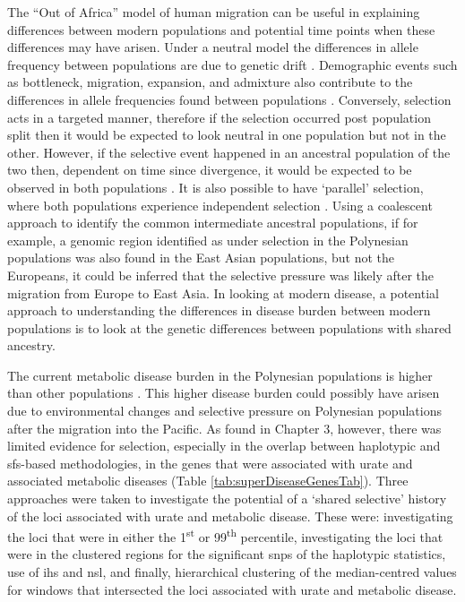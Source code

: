 \documentclass[]{report}
\begin{document}
The ``Out of Africa'' model of human migration can be useful in
explaining differences between modern populations and potential time
points when these differences may have arisen. Under a neutral model the
differences in allele frequency between populations are due to genetic
drift \citep{kimura1979neutral}. Demographic events such as bottleneck,
migration, expansion, and admixture also contribute to the differences
in allele frequencies found between populations \citep{Wright1951}.
Conversely, selection acts in a targeted manner, therefore if the
selection occurred post population split then it would be expected to
look neutral in one population but not in the other. However, if the
selective event happened in an ancestral population of the two then,
dependent on time since divergence, it would be expected to be observed
in both populations \citep{Hermisson2017}. It is also possible to have
`parallel' selection, where both populations experience independent
selection \citep{Tennessen2011}. Using a coalescent approach to identify
the common intermediate ancestral populations, if for example, a genomic
region identified as under selection in the Polynesian populations was
also found in the East Asian populations, but not the Europeans, it
could be inferred that the selective pressure was likely after the
migration from Europe to East Asia. In looking at modern disease, a
potential approach to understanding the differences in disease burden
between modern populations is to look at the genetic differences between
populations with shared ancestry.

The current metabolic disease burden in the Polynesian populations is
higher than other populations \citep{Winnard2012, Winnard2013}. This
higher disease burden could possibly have arisen due to environmental
changes and selective pressure on Polynesian populations after the
migration into the Pacific. As found in Chapter 3, however, there was
limited evidence for selection, especially in the overlap between
haplotypic and \gls{sfs}-based methodologies, in the genes that were
associated with urate and associated metabolic diseases (Table
\ref{tab:superDiseaseGenesTab}). Three approaches were taken to
investigate the potential of a `shared selective' history of the loci
associated with urate and metabolic disease. These were: investigating
the loci that were in either the 1\textsuperscript{st} or
99\textsuperscript{th} percentile, investigating the loci that were in
the clustered regions for the significant \glspl{snp} of the haplotypic
statistics, use of \gls{ihs} and \gls{nsl}, and finally, hierarchical
clustering of the median-centred values for windows that intersected the
loci associated with urate and metabolic disease.
\end{document}
